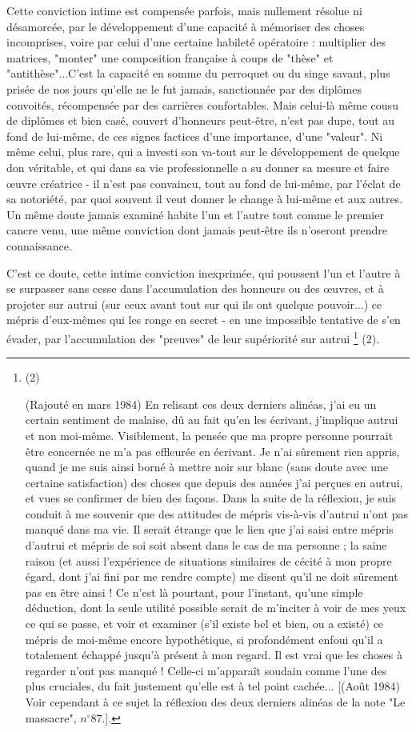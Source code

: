Cette conviction intime est compensée parfois, mais nullement résolue ni désamorcée, par le développement d'une capacité à mémoriser des choses incomprises, voire par celui d'une certaine habileté opératoire : multiplier des matrices, "monter" une composition française à coups de "thèse" et "antithèse"...C'est la capacité en somme du perroquet ou du singe savant, plus prisée de nos jours qu'elle ne le fut jamais, sanctionnée par des diplômes convoités, récompensée par des carrières confortables. Mais celui-là même cousu de diplômes et bien casé, couvert d'honneurs peut-être, n'est pas dupe, tout au fond de lui-même, de ces signes factices d'une importance, d'une "valeur". Ni même celui, plus rare, qui a investi son va-tout sur le développement de quelque don véritable, et qui dans sa vie professionnelle a su donner sa mesure et faire œuvre créatrice - il n'est pas convaincu, tout au fond de lui-même, par l'éclat de sa notoriété, par quoi souvent il veut donner le change à lui-même et aux autres. Un même doute jamais examiné habite l'un et l'autre tout comme le premier cancre venu, une même conviction dont jamais peut-être ils n'oseront prendre connaissance.

C'est ce doute, cette intime conviction inexprimée, qui poussent l'un et l'autre à se surpasser sans cesse dans l'accumulation des honneurs ou des œuvres, et à projeter sur autrui (sur ceux avant tout sur qui ils ont quelque pouvoir...) ce mépris d'eux-mêmes qui les ronge en secret - en une impossible tentative de s'en évader, par l'accumulation des "preuves" de leur supériorité sur autrui \footnote{(2)\par (Rajouté en mars 1984) En relisant ces deux derniers alinéas, j’ai eu un certain sentiment de malaise, dû au fait qu'en les écrivant, j'implique autrui et non moi-même. Visiblement, la pensée que ma propre personne pourrait être concernée ne m'a pas effleurée en écrivant. Je n'ai sûrement rien appris, quand je me suis ainsi borné à mettre noir sur blanc (sans doute avec une certaine satisfaction) des choses que depuis des années j'ai perçues en autrui, et vues se confirmer de bien des façons. Dans la suite de la réflexion, je suis conduit à me souvenir que des attitudes de mépris vis-à-vis d'autrui n'ont pas manqué dans ma vie. Il serait étrange que le lien que j'ai saisi entre mépris d'autrui et mépris de soi soit absent dans le cas de ma personne ; la saine raison (et aussi l'expérience de situations similaires de cécité à mon propre égard, dont j'ai fini par me rendre compte) me disent qu'il ne doit sûrement pas en être ainsi ! Ce n'est là pourtant, pour l'instant, qu'une simple déduction, dont la seule utilité possible serait de m'inciter à voir de mes yeux ce qui se passe, et voir et examiner (s'il existe bel et bien, ou a existé) ce mépris de moi-même encore hypothétique, si profondément enfoui qu'il a totalement échappé jusqu'à présent à mon regard. Il est vrai que les choses à regarder n'ont pas manqué ! Celle-ci m'apparaît soudain comme l'une des plus cruciales, du fait justement qu'elle est à tel point cachée... [(Août 1984) Voir cependant à ce sujet la réflexion des deux derniers alinéas de la note "Le massacre", $n^{\circ} 87$.].} (2).

